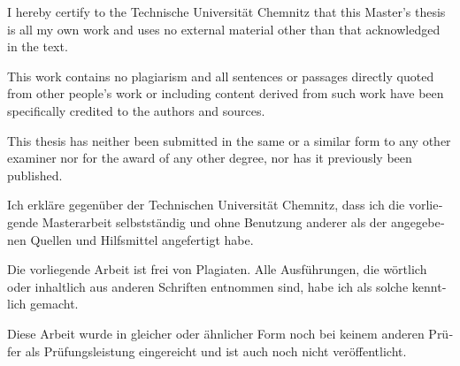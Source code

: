%
%

\begin{tucerklaerung}
I hereby certify to the Technische Universität Chemnitz that this Master's thesis is all my own work and uses no external material
other than that acknowledged in the text.

This work contains no plagiarism and all sentences or passages directly
quoted from other people's work or including content derived from such work
have been specifically credited to the authors and sources.

This thesis has neither been submitted in the same or a similar form to any
other examiner nor for the award of any other degree, nor has it previously
been published.

\end{tucerklaerung}

\vspace*{0pt plus 1fill}
%
%

\begin{otherlanguage}{ngerman}
\begin{tucerklaerung}
Ich erkläre gegenüber der Technischen Universität Chemnitz, dass ich die
vorliegende Masterarbeit selbstständig und ohne Benutzung anderer
als der angegebenen Quellen und Hilfsmittel angefertigt habe.

Die vorliegende Arbeit ist frei von Plagiaten. Alle Ausführungen, die wörtlich
oder inhaltlich aus anderen Schriften entnommen sind, habe ich als solche
kenntlich gemacht.

Diese Arbeit wurde in gleicher oder ähnlicher Form noch bei keinem anderen
Prüfer als Prüfungsleistung eingereicht und ist auch noch nicht veröffentlicht.

\end{tucerklaerung}
\end{otherlanguage}
